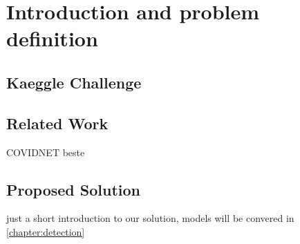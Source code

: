 \chapter{Introduction and problem definition}\label{chapter:intro}

\section{Kaeggle Challenge}

\section{Related Work}
COVIDNET beste \autocite{wang2020covid} 

\section{Proposed Solution}
just a short introduction to our solution, models will be convered in \vref{chapter:detection}